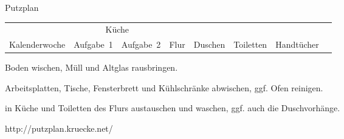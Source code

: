 \documentclass[landscape]{slides}
\begin{document}
\begin{slide}
\begin{center}
\Large Putzplan
\end{center}

\begin{small}
\begin{tabular}{rrrccccccc}
    \toprule
    & & & \multicolumn{2}{c}{Küche} \\ \cmidrule{4-5}
    \multicolumn{3}{c}{Kalenderwoche} & Aufgabe~1 & Aufgabe~2 & Flur & Duschen & Toiletten & Handtücher \\ \midrule

    

    \bottomrule
\end{tabular}
\end{small}

\begin{tiny}
\begin{description}
    \setlength{\itemsep}{0pt}
    \item[Aufgabe~1] Boden wischen, Müll und Altglas rausbringen.
    \item[Aufgabe~2] Arbeitsplatten, Tische, Fensterbrett und Kühlschränke abwischen, ggf. Ofen reinigen.
    \item[Handtücher] in Küche und Toiletten des Flurs austauschen und waschen, ggf. auch die Duschvorhänge.
\end{description}
\vspace{-1em}
\hfill http://putzplan.kruecke.net/
\end{tiny}
\end{slide}
\end{document}
